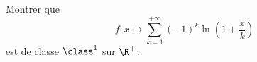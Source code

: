 \begin{enonce}
\begin{exercise}[ID={RMS135 E1458},subtitle={IMT MP 2024},tags={},difficulty={}]

Montrer que
\begin{equation*}
f : x \mapsto \sum_{k=1}^{+\infty} (-1)^k \ln\left(1 + \frac{x}{k}\right)
\end{equation*}
est de classe $\class^1$ sur $\R^+$.

\end{exercise}
\begin{solution}
\end{solution}
\end{enonce}
